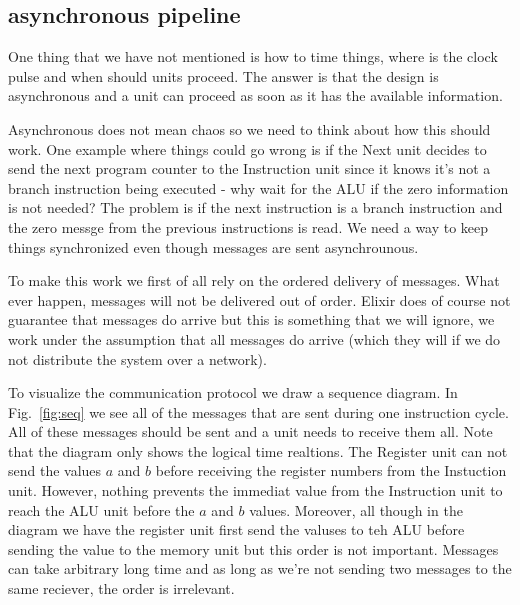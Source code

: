 \documentclass[a4paper,11pt]{article}
\begin{document}
\subsection{asynchronous pipeline}

One thing that we have not mentioned is how to time things, where is
the clock pulse and when should units proceed. The answer is that the
design is asynchronous and a unit can proceed as soon as it has the
available information.

Asynchronous does not mean chaos so we need to think about how this
should work. One example where things could go wrong is if the Next
unit decides to send the next program counter to the Instruction unit
since it knows it's not a branch instruction being executed - why wait
for the ALU if the zero information is not needed? The problem is if
the next instruction is a branch instruction and the zero messge from
the previous instructions is read. We need a way to keep things
synchronized even though messages are sent asynchrounous. 

To make this work we first of all rely on the ordered delivery of
messages. What ever happen, messages will not be delivered out of
order. Elixir does of course not guarantee that messages do arrive but
this is something that we will ignore, we work under the assumption
that all messages do arrive (which they will if we do not distribute
the system over a network).

To visualize the communication protocol we draw a sequence diagram. In
Fig.~\ref{fig:seq} we see all of the messages that are sent during one
instruction cycle. All of these messages should be sent and a unit
needs to receive them all. Note that the diagram only shows the
logical time realtions. The Register unit can not send the values $a$
and $b$ before receiving the register numbers from the Instuction
unit. However, nothing prevents the immediat value from the
Instruction unit to reach the ALU unit before the $a$ and $b$
values. Moreover, all though in the diagram we have the register unit
first send the valuses to teh ALU before sending the value to the
memory unit but this order is not important. Messages can take
arbitrary long time and as long as we're not sending two messages to
the same reciever, the order is irrelevant. 
\end{document}
